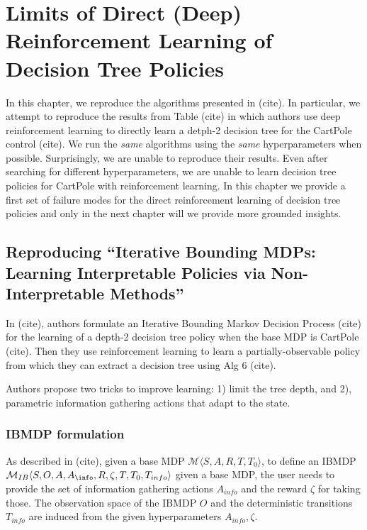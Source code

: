 \chapter{Limits of Direct (Deep) Reinforcement Learning of Decision Tree Policies}
In this chapter, we reproduce the algorithms presented in (cite). In particular, we attempt to reproduce the results from Table (cite) in which authors use deep reinforcement learning to directly learn a detph-2 decision tree for the CartPole control (cite).
We run the \textit{same} algorithms using the \textit{same} hyperparameters when possible.
Surprisingly, we are unable to reproduce their results. Even after searching for different hyperparameters, we are unable to learn decision tree policies for CartPole with reinforcement learning. 
In this chapter we provide a first set of failure modes for the direct reinforcement learning of decision tree policies and only in the next chapter will we provide more grounded insights.

\section{Reproducing ``Iterative Bounding MDPs: Learning Interpretable Policies via Non-Interpretable Methods''}
In (cite), authors formulate an Iterative Bounding Markov Decision Process (cite) for the learning of a depth-2 decision tree policy when the base MDP is CartPole (cite).
Then they use reinforcement learning to learn a partially-observable policy from which they can extract a decision tree using Alg 6 (cite). 

Authors propose two tricks to improve learning: 1) limit the tree depth, and 2), parametric information gathering actions that adapt to the state.

\subsection{IBMDP formulation}
As described in (cite), given a base MDP $\mathcal{M}\langle S, A, R, T, T_0\rangle$, to define an IBMDP $\mathcal{M}_{IB}\langle S, O, A, A_{\info}, R, \zeta, T, T_0, T_{info}\rangle$ given a base MDP, the user needs to provide the set of information gathering actions $A_{info}$ and the reward $\zeta$ for taking those.
The observation space of the IBMDP $O$ and the deterministic transitions $T_{info}$ are induced from the given hyperparameters $A_{info}, \zeta$.

